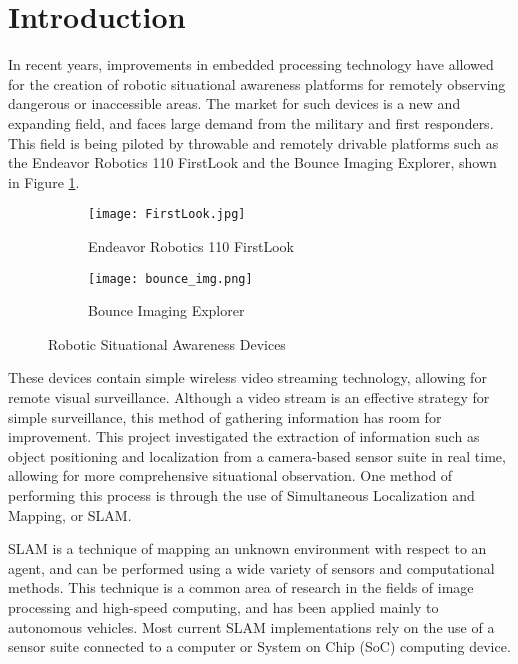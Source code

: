 \section{Introduction}
In recent years, improvements in embedded processing technology have allowed for the creation of robotic situational awareness platforms for remotely observing dangerous or inaccessible areas. The market for such devices is a new and expanding field, and faces large demand from the military and first responders. This field is being piloted by throwable and remotely drivable platforms such as the Endeavor Robotics 110 FirstLook and the Bounce Imaging Explorer, shown in Figure \ref{robocop}. 

\par
\begin{figure}[H]
        \begin{subfigure}[h]{0.5\textwidth}
             \centerline{\texttt{[image: FirstLook.jpg]}}
            \caption{Endeavor Robotics 110 FirstLook \cite{endeavor}}
        \end{subfigure}
        \begin{subfigure}[h]{0.5\textwidth}
            \centerline{\texttt{[image: bounce\_img.png]}}
            \caption{Bounce Imaging Explorer \cite{bounceImaging}}
        \end{subfigure}
\caption{Robotic Situational Awareness Devices}
\label{robocop}
\end{figure}
\par
These devices contain simple wireless video streaming technology, allowing for remote visual surveillance. Although a video stream is an effective strategy for simple surveillance, this method of gathering information has room for improvement. This project investigated the extraction of information such as object positioning and localization from a camera-based sensor suite in real time, allowing for more comprehensive situational observation. One method of performing this process is through the use of Simultaneous Localization and Mapping, or SLAM. 
\par
SLAM is a technique of mapping an unknown environment with respect to an agent, and can be performed using a wide variety of sensors and computational methods. This technique is a common area of research in the fields of image processing and high-speed computing, and has been applied mainly to autonomous vehicles. Most current SLAM implementations rely on the use of a sensor suite connected to a computer or System on Chip (SoC) computing device. 
